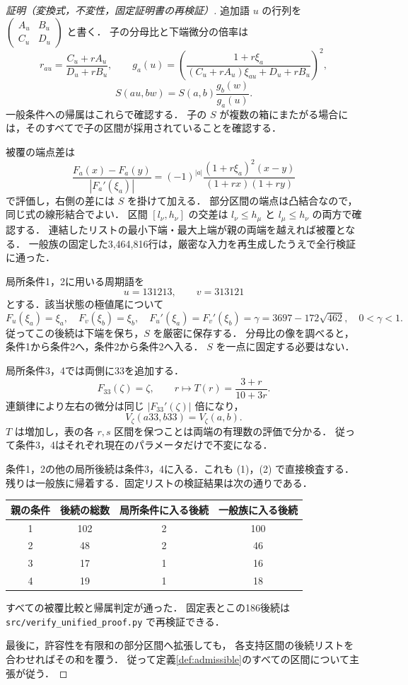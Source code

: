 \documentclass[10pt,a4paper]{article}
\theoremstyle{definition}
\newcommand{\file}[1]{{\small\nolinkurl{#1}}}
\begin{document}
\begin{proof}[証明（変換式，不変性，固定証明書の再検証）]
追加語 $u$ の行列を
$\left(\begin{smallmatrix}A_u&B_u\\C_u&D_u\end{smallmatrix}\right)$ と書く．
子の分母比と下端微分の倍率は
\[
 r_{au}=\frac{C_u+rA_u}{D_u+rB_u},\qquad
 g_a(u)=
 \left(\frac{1+r\xi_a}{(C_u+rA_u)\xi_{au}+D_u+rB_u}\right)^2,
\]
\[
 S(au,bw)=S(a,b)\frac{g_b(w)}{g_a(u)}.                    \tag{2}
\]
一般条件への帰属はこれらで確認する．
子の $S$ が複数の箱にまたがる場合には，そのすべてで子の区間が採用されていることを確認する．

被覆の端点差は
\[
 \frac{F_a(x)-F_a(y)}{|F_a'(\xi_a)|}
 =(-1)^{|a|}\frac{(1+r\xi_a)^2(x-y)}
                  {(1+rx)(1+ry)}
\]
で評価し，右側の差には $S$ を掛けて加える．
部分区間の端点は凸結合なので，同じ式の線形結合でよい．
区間 $[l_\nu,h_\nu]$ の交差は
$l_\nu\le h_\mu$ と $l_\mu\le h_\nu$ の両方で確認する．
連結したリストの最小下端・最大上端が親の両端を越えれば被覆となる．
一般族の固定した3,464,816行は，厳密な入力を再生成したうえで全行検証に通った．

局所条件1，2に用いる周期語を
\[
 u=131213,\qquad v=313121
\]
とする．該当状態の極値尾について
\[
 F_u(\xi_a)=\xi_a,\quad F_v(\xi_b)=\xi_b,\quad
 F_u'(\xi_a)=F_v'(\xi_b)=\gamma=3697-172\sqrt{462},
 \quad 0<\gamma<1.
\]
従ってこの後続は下端を保ち，$S$ を厳密に保存する．
分母比の像を調べると，条件1から条件2へ，条件2から条件2へ入る．
$S$ を一点に固定する必要はない．

局所条件3，4では両側に33を追加する．
\[
 F_{33}(\zeta)=\zeta,\qquad
 r\longmapsto T(r)=\frac{3+r}{10+3r}.
\]
連鎖律により左右の微分は同じ $|F_{33}'(\zeta)|$ 倍になり，
\[
 V_\zeta(a33,b33)=V_\zeta(a,b).                          \tag{3}
\]
$T$ は増加し，表の各 $r,s$ 区間を保つことは両端の有理数の評価で分かる．
従って条件3，4はそれぞれ現在のパラメータだけで不変になる．

条件1，2の他の局所後続は条件3，4に入る．これも (1)，(2) で直接検査する．
残りは一般族に帰着する．固定リストの検証結果は次の通りである．
\begin{center}\small
\begin{tabular}{cccc}
\toprule
親の条件 & 後続の総数 & 局所条件に入る後続 & 一般族に入る後続\\
\midrule
1 & 102 & 2 & 100\\
2 & 48 & 2 & 46\\
3 & 17 & 1 & 16\\
4 & 19 & 1 & 18\\
\bottomrule
\end{tabular}
\end{center}
すべての被覆比較と帰属判定が通った．
固定表とこの186後続は \file{src/verify_unified_proof.py} で再検証できる．

最後に，許容性を有限和の部分区間へ拡張しても，
各支持区間の後続リストを合わせればその和を覆う．
従って定義\ref{def:admissible}のすべての区間について主張が従う．
\end{proof}
\end{document}
